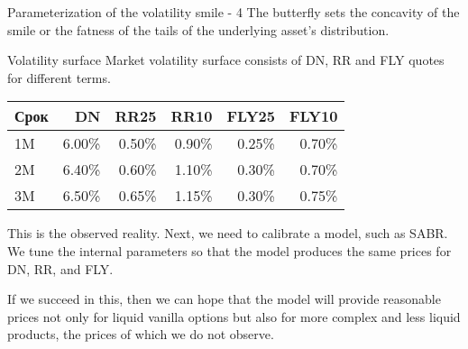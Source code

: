 \documentclass{beamer}
\begin{document}
\begin{frame}{Parameterization of the volatility smile - 4}
\justify
The butterfly sets the concavity of the smile or the fatness of the tails of the underlying asset's distribution.

\centering
{}
\end{frame}



\begin{frame}{Volatility surface}
\justify
Market volatility surface consists of DN, RR and FLY quotes for different terms.

\justify
\centering
\begin{tabular}{l|r|r|r|r|r}
Срок & DN     & RR25   & RR10   & FLY25  & FLY10  \\ \hline
1M   & 6.00\% & 0.50\% & 0.90\% & 0.25\% & 0.70\% \\
2M   & 6.40\% & 0.60\% & 1.10\% & 0.30\% & 0.70\% \\
3M   & 6.50\% & 0.65\% & 1.15\% & 0.30\% & 0.75\% 
\end{tabular}

\justify
This is the observed reality. Next, we need to calibrate a model, such as SABR. We tune the internal parameters so that the model produces the same prices for DN, RR, and FLY.

\justify
If we succeed in this, then we can hope that the model will provide reasonable prices not only for liquid vanilla options but also for more complex and less liquid products, the prices of which we do not observe.
\end{frame}
\end{document}
